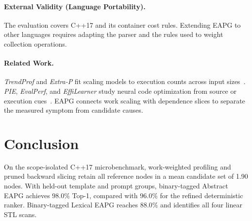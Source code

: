 \paragraph{External Validity (Language Portability).}
The evaluation covers C++17 and its container cost rules. Extending EAPG to other languages requires adapting the parser and the rules used to weight collection operations.

\paragraph{Related Work.}
\textit{TrendProf} and \textit{Extra-P} fit scaling models to execution counts across input sizes~\cite{goldsmith2007trendprof,copik2021extrap}. \textit{PIE}, \textit{EvalPerf}, and \textit{EffiLearner} study neural code optimization from source or execution cues~\cite{madaan2024pie,liu2024evalperf,huang2024effilearner}. EAPG connects work scaling with dependence slices to separate the measured symptom from candidate causes.

\section{Conclusion}
\label{sec:conclusion}

On the scope-isolated C++17 microbenchmark, work-weighted profiling and pruned backward slicing retain all reference nodes in a mean candidate set of 1.90 nodes. With held-out template and prompt groups, binary-tagged Abstract EAPG achieves $98.0\%$ Top-1, compared with $96.0\%$ for the refined deterministic ranker. Binary-tagged Lexical EAPG reaches $88.0\%$ and identifies all four linear STL scans.





